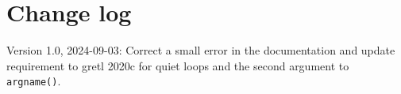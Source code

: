 \documentclass{article}
\begin{document}
\section{Change log}

Version 1.0, 2024-09-03: Correct a small error in the documentation
and update requirement to gretl 2020c for quiet loops and the second
argument to \texttt{argname()}.



\end{document}
